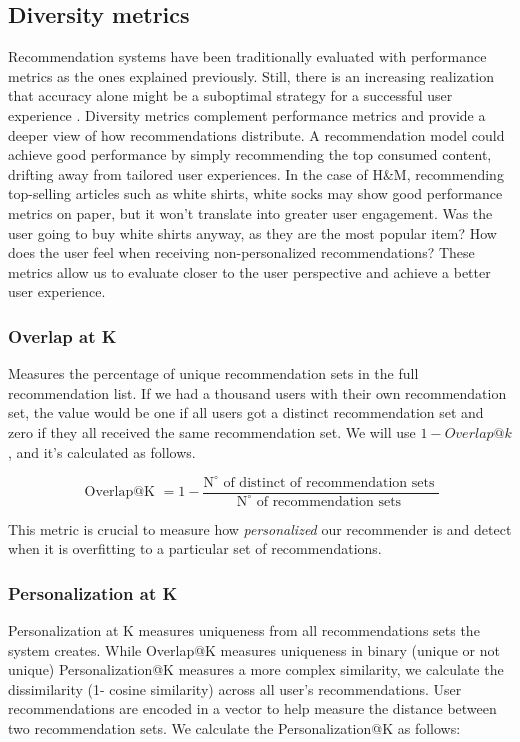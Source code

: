 \documentclass{tex_files/kththesis}
\begin{document}
\subsection{Diversity metrics}
Recommendation systems have been traditionally evaluated with performance metrics as the ones explained previously. Still, there is an increasing realization that accuracy alone might be a suboptimal strategy for a successful user experience \cite{noveltyintro}.
Diversity metrics complement performance metrics and provide a deeper view of how recommendations distribute. A recommendation model could achieve good performance by simply recommending the top consumed content, drifting away from tailored user experiences. In the case of H\&M, recommending top-selling articles such as white shirts, white socks may show good performance metrics on paper, but it won't translate into greater user engagement. Was the user going to buy white shirts anyway, as they are the most popular item? How does the user feel when receiving non-personalized recommendations? These metrics allow us to evaluate closer to the user perspective and achieve a better user experience.

\subsubsection{Overlap at K}
Measures the percentage of unique recommendation sets in the full recommendation list. If we had a thousand users with their own recommendation set, the value would be one if all users got a distinct recommendation set and zero if they all received the same recommendation set. We will use $1-Overlap@k$, and it's calculated as follows. 

\begin{equation}
\text { Overlap@K }= 1 -  \frac{\mathrm{N}^{\circ} \text { of distinct of recommendation sets }}{\mathrm{N}^{\circ} \text { of recommendation sets }}
\end{equation}

This metric is crucial to measure how \textit{personalized} our recommender is and detect when it is overfitting to a particular set of recommendations. 
\subsubsection{Personalization at K}
Personalization at K measures uniqueness from all recommendations sets the system creates. While Overlap@K measures uniqueness in binary (unique or not unique) Personalization@K measures a more complex similarity, we calculate the dissimilarity (1- cosine similarity) across all user's recommendations. User recommendations are encoded in a vector to help measure the distance between two recommendation sets. We calculate the Personalization@K as follows:
\end{document}
